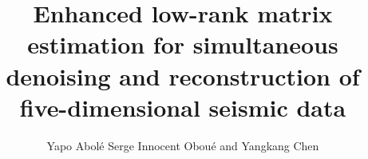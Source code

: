 \DeclareRobustCommand{\dlo}[1]{}
\DeclareRobustCommand{\wen}[1]{#1}
\newcommand{\R}{\textup{\textrm{R}}\xspace}
\newtheorem{Assumption}{Assumption}

\title{Enhanced low-rank matrix estimation for simultaneous denoising and reconstruction of five-dimensional seismic data}

\renewcommand{\thefootnote}{\fnsymbol{footnote}}

\author{Yapo Abol{\'e} Serge Innocent Obou{\'e} and Yangkang Chen}


\address{Zhejiang University\\
	School of Earth Sciences\\
	Hangzhou, Zhejiang, China\\
	obouesonofgod1@gmail.com \& chenyk2016@gmail.com\\
	Corresponding Author: Yangkang Chen (chenyk2016@gmail.com) 
}


\maketitle

